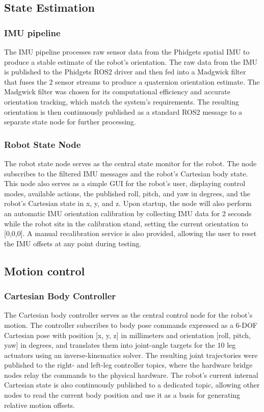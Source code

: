 \subsection{State Estimation}
\subsubsection*{IMU pipeline}
The IMU pipeline processes raw sensor data from the Phidgets spatial IMU to produce a stable estimate of the robot's orientation. The raw data from the IMU is published to the Phidgets ROS2 driver and then fed into a Madgwick filter \cite{madgwick_efficient_2010} that fuses the 2 sensor streams to produce a quaternion orientation estimate. The Madgwick filter was chosen for its computational efficiency and accurate orientation tracking, which match the system's requirements. The resulting orientation is then continuously published as a standard ROS2 message to a separate state node for further processing.

\subsubsection*{Robot State Node}
The robot state node serves as the central state monitor for the robot. The node subscribes to the filtered IMU messages and the robot's Cartesian body state. This node also serves as a simple GUI for the robot's user, displaying control modes, available actions, the published roll, pitch, and yaw in degrees, and the robot's Cartesian state in x, y, and z. Upon startup, the node will also perform an automatic IMU orientation calibration by collecting IMU data for 2 seconds while the robot sits in the calibration stand, setting the current orientation to [0,0,0]. A manual recalibration service is also provided, allowing the user to reset the IMU offsets at any point during testing.

\subsection{Motion control}
\subsubsection*{Cartesian Body Controller}
The Cartesian body controller serves as the central control node for the robot's motion. The controller subscribes to body pose commands expressed as a 6-DOF Cartesian pose with position [x, y, z] in millimeters and orientation [roll, pitch, yaw] in degrees, and translates them into joint-angle targets for the 10 leg actuators using an inverse-kinematics solver. The resulting joint trajectories were published to the right- and left-leg controller topics, where the hardware bridge nodes relay the commands to the physical hardware. The robot's current internal Cartesian state is also continuously published to a dedicated topic, allowing other nodes to read the current body position and use it as a basis for generating relative motion offsets.
